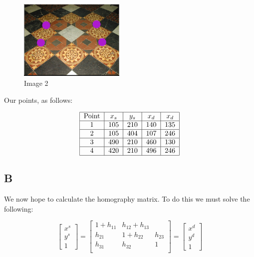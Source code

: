 \documentclass{article}
\begin{document}
\begin{figure}[H]
    \centering
    \includegraphics[width = 0.45\textwidth]{imgs/2-2-dots.png}
    \caption{Image 2}
    \label{fig:prob2-1b}
\end{figure}


Our points, as follows:

\begin{equation}
    \begin{tabular}{ | c | c | c | c | c | }
        \hline
        Point & $x_s$ & $y_s$ & $x_d$ & $x_d$\\
        \hline
        1 & 105 & 210 & 140 & 135 \\
        \hline
        2 & 105 & 404 & 107 & 246 \\
        \hline
        3 & 490 & 210 & 460 & 130 \\
        \hline
        4 & 420 & 210 & 496 & 246 \\
        \hline
    \end{tabular}
\end{equation}

\subsection*{B}

We now hope to calculate the homography matrix. To do this we must solve the following:

\begin{equation}
    \begin{bmatrix}
        x^s \\ y^s \\ 1
    \end{bmatrix} = \begin{bmatrix}
        1+h_{11} & h_{12} + h_{13} \\
        h_{21} & 1+h_{22} & h_{23} \\
        h_{31} & h_{32} & 1\\
    \end{bmatrix} =
    \begin{bmatrix}
        x^d \\ y^d \\ 1
    \end{bmatrix}
\end{equation}
\end{document}
